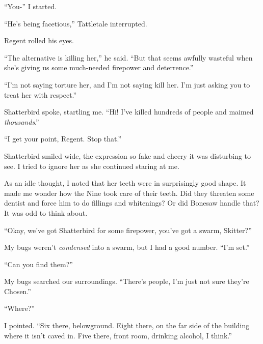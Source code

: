 ``You-'' I started.



``He's being facetious,'' Tattletale interrupted.



Regent rolled his eyes.



``The alternative is killing her,'' he said.  ``But that seems awfully wasteful when she's giving us some much-needed firepower and deterrence.''



``I'm not saying torture her, and I'm not saying kill her.  I'm just asking you to treat her with respect.''



Shatterbird spoke, startling me.  ``Hi!  I've killed hundreds of people and maimed \emph{thousands}.''



``I get your point, Regent.  Stop that.''



Shatterbird smiled wide, the expression so fake and cheery it was disturbing to see.  I tried to ignore her as she continued staring at me.



As an idle thought, I noted that her teeth were in surprisingly good shape.  It made me wonder how the Nine took care of their teeth.  Did they threaten some dentist and force him to do fillings and whitenings?  Or did Bonesaw handle that?  It was odd to think about.



``Okay, we've got Shatterbird for some firepower, you've got a swarm, Skitter?''



My bugs weren't \emph{condensed} into a swarm, but I had a good number.  ``I'm set.''



``Can you find them?''



My bugs searched our surroundings.  ``There's people, I'm just not sure they're Chosen.''



``Where?''



I pointed.  ``Six there, belowground.  Eight there, on the far side of the building where it isn't caved in.  Five there, front room, drinking alcohol, I think.''



